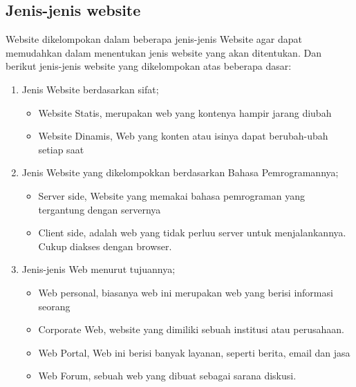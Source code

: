 \documentclass[12pt, a4paper]{article}
\begin{document}
\subsection{Jenis-jenis website}
Website dikelompokan dalam beberapa jenis-jenis Website agar dapat memudahkan dalam menentukan jenis website
yang akan ditentukan. Dan berikut jenis-jenis website yang dikelompokan atas beberapa dasar:
\begin{enumerate}
\item Jenis Website berdasarkan sifat;
\begin{itemize}
\item Website Statis, merupakan web yang kontenya hampir jarang diubah
\item Website Dinamis, Web yang konten atau isinya dapat berubah-ubah setiap saat
\end{itemize}
\item Jenis Website yang dikelompokkan berdasarkan Bahasa Pemrogramannya;
\begin{itemize}
\item Server side, Website yang memakai bahasa pemrograman yang tergantung dengan servernya
\item Client side, adalah web yang tidak perluu server untuk menjalankannya. Cukup diakses dengan browser.
\end{itemize}
\item Jenis-jenis Web menurut tujuannya;
\begin{itemize}
\item Web personal, biasanya web ini merupakan web yang berisi informasi seorang
\item Corporate Web, website yang dimiliki sebuah institusi atau perusahaan.
\item Web Portal, Web ini berisi banyak layanan, seperti berita, email dan jasa
\item Web Forum, sebuah web yang dibuat sebagai sarana diskusi.
\end{itemize}
\end{enumerate}
	
\end{document}
